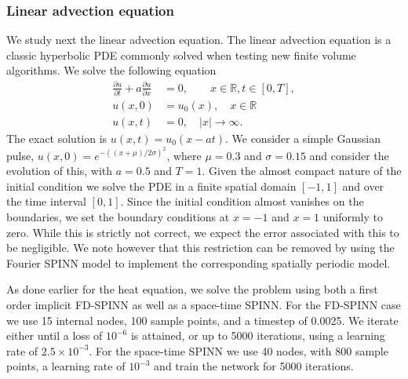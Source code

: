 \documentclass[12pt]{article}
\newcommand{\rb}[1]{#1}
\begin{document}
\subsubsection{Linear advection equation}
We study next the linear advection equation. The linear advection equation is a classic hyperbolic PDE commonly solved when testing new finite volume algorithms.  We solve the following equation
\begin{displaymath}
\begin{split}
\frac{\partial u}{\partial t} + a \frac{\partial u}{\partial x} &= 0, \quad \quad x \in \mathbb{R}, t \in [0, T],\\
u(x, 0) &= u_0(x), \quad x \in \mathbb{R}\\
u(x, t) &= 0 , \quad |x| \rightarrow \infty.
\end{split}
\end{displaymath}
The exact solution is $u(x, t) = u_0(x - at)$.  We consider a simple Gaussian pulse, $u(x, 0) = e^{-((x + \mu)/2 \sigma)^2}$, where $\mu = 0.3$ and $\sigma=0.15$ and consider the evolution of this, with $a=0.5$ and $T=1$.  Given the almost compact nature of the initial condition we solve the PDE in a finite spatial domain $[-1, 1]$ and over the time interval $[0, 1]$.  Since the initial condition almost vanishes on the boundaries, we set the boundary conditions at $x= -1$ and $x=1$ uniformly to zero.  While this is strictly not correct, we expect the error associated with this to be negligible.  We note however that this restriction can be removed by using the Fourier SPINN model to implement the corresponding spatially periodic model.

As done earlier for the heat equation, we solve the problem using both a first order implicit FD-SPINN as well as a space-time SPINN. \rb{For the FD-SPINN case we use 15 internal nodes, 100 sample points, and a timestep of 0.0025. We iterate either until a loss of $10^{-6}$ is attained, or up to 5000 iterations, using a learning rate of $2.5\times 10^{-3}$.  For the space-time SPINN we use 40 nodes, with 800 sample points, a learning rate of $10^{-3}$ and train the network for 5000 iterations.}
\end{document}
